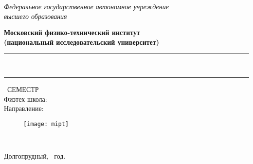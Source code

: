 \begin{titlepage}
	\clearpage\thispagestyle{empty}
	\centering
	
	\textit{Федеральное государственное автономное учреждение \\
		высшего образования}
	\vspace{0.5ex}
	
	\textbf{Московский физико-технический институт
    \\
    (национальный исследовательский университет)}
	\vspace{20ex}
	
	\rule{\linewidth}{0.5mm}
	{\textbf{\FullCourseNameFirstPart}}
	\\
	{\textbf{\FullCourseNameSecondPart}}
	\rule{\linewidth}{0.5mm}
	
	\SemesterNumber\ СЕМЕСТР
	\\
	Физтех-школа: \textit{\SchoolName}
	\\
	Направление: \textit{\TrackName}
	\vspace{1ex}
	
	\begin{figure}[!ht]
		\centering
		\texttt{[image: mipt]}
		\label{fig:mipt}
	\end{figure}
\begin{flushright}
	\noindent
	\\
\end{flushright}
	
	\vfill
	Долгопрудный, \CourseDate\ год.
	\pagebreak
	
\end{titlepage}